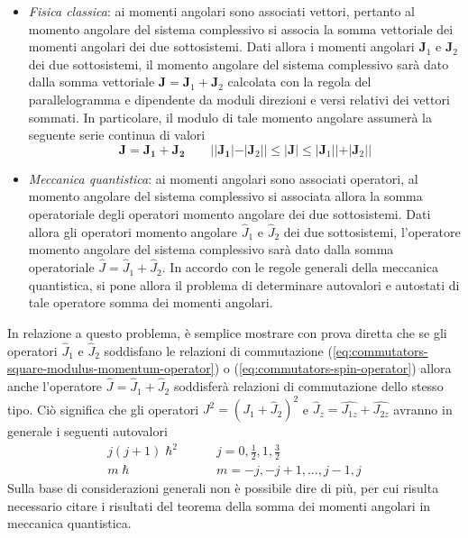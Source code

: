 \begin{itemize}
	\tightlist
	\item
	      \emph{Fisica classica}: ai momenti angolari sono associati vettori,
	      pertanto al momento angolare del sistema complessivo si associa la
	      somma vettoriale dei momenti angolari dei due sottosistemi.
	      Dati
	      allora i momenti angolari \(\bm{J}_{1}\) e \(\bm{J}_{2}\) dei due
	      sottosistemi, il momento angolare del sistema complessivo sarà dato
	      dalla somma vettoriale \(\bm{J} = \bm{J}_{1}+ \bm{J}_{2}\) calcolata
	      con la regola del parallelogramma e dipendente da moduli direzioni e
	      versi relativi dei vettori sommati.
	      In particolare, il modulo di tale
	      momento angolare assumerà la seguente serie continua di valori \[
		      \bm{J} = \bm{J_{1}} + \bm{J_{2}} \qquad | |\bm{J_{1}}| - |\bm{J}_{2}| | \leq | \bm{J}| \leq|\bm{J}_{1} | | + | \bm{J}_{2} | |
	      \]
	\item \emph{Meccanica quantistica}: ai momenti angolari sono associati
	      operatori, al momento angolare del sistema complessivo si associata
	      allora la somma operatoriale degli operatori momento angolare dei due
	      sottosistemi.
	      Dati allora gli operatori momento angolare
	      \(\hat{J}_{1}\) e \(\hat{J}_{2}\) dei due sottosistemi, l'operatore
	      momento angolare del sistema complessivo sarà dato dalla somma
	      operatoriale \(\hat{J} = \hat{J}_{1}+ \hat{J}_{2}\).
	      In accordo con le
	      regole generali della meccanica quantistica, si pone allora il
	      problema di determinare autovalori e autostati di tale operatore somma
	      dei momenti angolari.
\end{itemize}

In relazione a questo problema, è semplice mostrare con prova diretta
che se gli operatori \(\hat{J}_{1}\) e \(\hat{J}_{2}\) soddisfano le
relazioni di commutazione (\ref{eq:commutators-square-modulus-momentum-operator}) o (\ref{eq:commutators-spin-operator})
allora anche l'operatore
\(\hat{J} = \hat{J}_{1}+ \hat{J}_{2}\) soddisferà relazioni di
commutazione dello stesso tipo.
Ciò significa che gli operatori
\(J^{2} = (J_{1} + \hat{J}_{2})^{2}\) e
\(\hat{J}_{z} = \hat{J_{1z}} + \hat{J_{2z}}\) avranno in generale i
seguenti autovalori
\begin{align*}
	j(j+1) \hslash^{2} \qquad & j = 0, \frac{1}{2}, 1, \frac{3}{2}\\
	m \hslash  \qquad \quad & m = -j , -j +1, \dots , j-1, j
\end{align*} Sulla base di considerazioni generali non è possibile dire di più,
per cui risulta necessario citare i risultati del teorema della somma
dei momenti angolari in meccanica quantistica.

